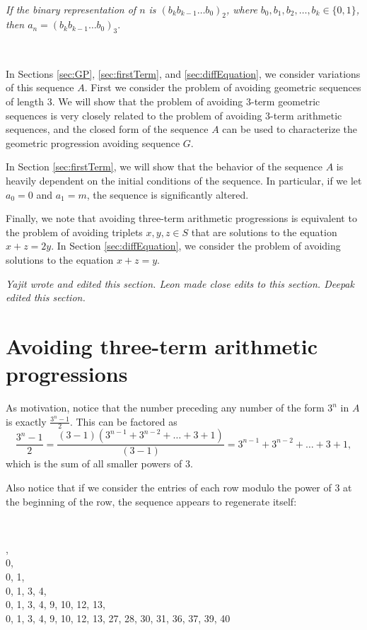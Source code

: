 \documentclass[11pt,letterpaper,twoside,english]{article}
\theoremstyle{theorem}
\theoremstyle{remark}
\begin{document}
\

 {\itshape If the binary representation of $n$ is $(b_kb_{k-1}\ldots b_0)_2$, where $b_0, b_1, b_2, \ldots, b_k \in \{0, 1\}$, then $a_n = (b_k b_{k-1}\ldots b_0)_3.$}

\

In Sections \ref{sec:GP}, \ref{sec:firstTerm}, and \ref{sec:diffEquation}, we consider variations of this sequence $A$. First we consider the problem of avoiding geometric sequences of length 3. We will show that the problem of avoiding 3-term geometric sequences is very closely related to the problem of avoiding 3-term arithmetic sequences, and the closed form of the sequence $A$ can be used to characterize the geometric progression avoiding sequence $G$. 

In Section \ref{sec:firstTerm}, we will show that the behavior of the sequence $A$ is heavily dependent on the initial conditions of the sequence. In particular, if we let $a_0=0$ and $a_1=m$, the sequence is significantly altered. 

Finally, we note that avoiding three-term arithmetic progressions is equivalent to the problem of avoiding triplets $x,y,z\in S$ that are solutions to the equation $x+z=2y$. In Section \ref{sec:diffEquation}, we consider the problem of avoiding solutions to the equation $x+z =y$.



\emph{Yajit wrote and edited this section. Leon made close edits to this section. Deepak edited this section.}

\section{Avoiding three-term arithmetic progressions} \label{sec:AP}

As motivation, notice that the number preceding any number of the form $3^n$ in $A$ is exactly $\frac{3^n-1}{2}$. This can be factored as 
\[\frac{3^n-1}{2}=\frac{(3-1)(3^{n-1}+3^{n-2}+\ldots+3+1)}{(3-1)}=3^{n-1}+3^{n-2}+\ldots+3+1,\]
which is the sum of all smaller powers of $3$.

Also notice that if we consider the entries of each row modulo the power of $3$ at the beginning of the row, the sequence appears to regenerate itself:

\

, 
\\0, 
\\0, 1, 
\\0, 1, 3, 4, 
\\ 0, 1, 3, 4, 9, 10, 12, 13,
\\0, 1, 3, 4, 9, 10, 12, 13, 27, 28, 30, 31, 36, 37, 39, 40
\end{document}
